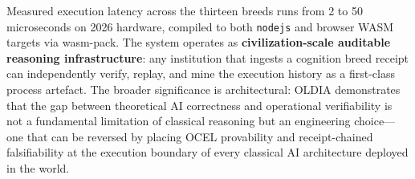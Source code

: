 \medskip
\noindent
Measured execution latency across the thirteen breeds runs from 2 to 50
microseconds on 2026 hardware, compiled to both \texttt{nodejs} and browser WASM
targets via wasm-pack.
The system operates as \textbf{civilization-scale auditable reasoning
infrastructure}: any institution that ingests a cognition breed receipt can
independently verify, replay, and mine the execution history as a first-class
process artefact.
The broader significance is architectural: OLDIA demonstrates that the gap between
theoretical AI correctness and operational verifiability is not a fundamental
limitation of classical reasoning but an engineering choice---one that can be
reversed by placing OCEL provability and receipt-chained falsifiability at the
execution boundary of every classical AI architecture deployed in the world.
